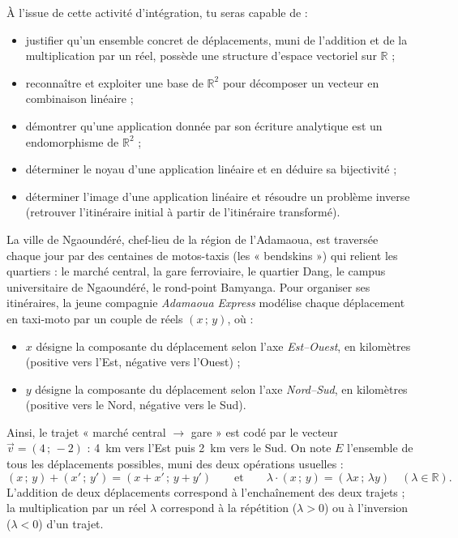 \documentclass[11pt]{article}
\newcommand{\cle}[1]{{\popxbold\color{popdark}#1}}
\newcounter{popsec}
\newcounter{popsub}
\newcommand{\courssub}[1]{%
  \stepcounter{popsub}%
  \par\vspace{9pt}\noindent{\popxbold\fontsize{11.5}{13}\selectfont\color{popink}{\color{poporange}\thepopsec.\thepopsub}\hspace{6pt}#1}\par\nopagebreak\vspace{4pt}
}
\begin{document}
À l'issue de cette activité d'intégration, tu seras capable de :
\begin{itemize}
\item justifier qu'un ensemble concret de déplacements, muni de l'addition et de la multiplication par un réel, possède une structure d'\cle{espace vectoriel sur} $\mathbb{R}$ ;
\item reconnaître et exploiter une \cle{base} de $\mathbb{R}^2$ pour décomposer un vecteur en \cle{combinaison linéaire} ;
\item démontrer qu'une application donnée par son écriture analytique est un \cle{endomorphisme} de $\mathbb{R}^2$ ;
\item déterminer le \cle{noyau} d'une application linéaire et en déduire sa \cle{bijectivité} ;
\item déterminer l'\cle{image} d'une application linéaire et résoudre un problème inverse (retrouver l'itinéraire initial à partir de l'itinéraire transformé).
\end{itemize}

\courssub{Situation}

La ville de Ngaoundéré, chef-lieu de la région de l'Adamaoua, est traversée chaque jour par des centaines de motos-taxis (les « bendskins ») qui relient les quartiers : le marché central, la gare ferroviaire, le quartier Dang, le campus universitaire de Ngaoundéré, le rond-point Bamyanga. Pour organiser ses itinéraires, la jeune compagnie \emph{Adamaoua Express} modélise chaque déplacement en taxi-moto par un couple de réels $(x\,;\,y)$, où :
\begin{itemize}
\item $x$ désigne la composante du déplacement selon l'axe \emph{Est--Ouest}, en kilomètres (positive vers l'Est, négative vers l'Ouest) ;
\item $y$ désigne la composante du déplacement selon l'axe \emph{Nord--Sud}, en kilomètres (positive vers le Nord, négative vers le Sud).
\end{itemize}
Ainsi, le trajet « marché central $\to$ gare » est codé par le vecteur $\vec{v}=(4\,;\,-2)$ : \SI{4}{km} vers l'Est puis \SI{2}{km} vers le Sud. On note $E$ l'ensemble de tous les déplacements possibles, muni des deux opérations usuelles :
\[
(x\,;\,y)+(x'\,;\,y')=(x+x'\,;\,y+y') \qquad \text{et} \qquad \lambda\cdot(x\,;\,y)=(\lambda x\,;\,\lambda y)\quad (\lambda\in\mathbb{R}).
\]
L'addition de deux déplacements correspond à l'enchaînement des deux trajets ; la multiplication par un réel $\lambda$ correspond à la répétition ($\lambda>0$) ou à l'inversion ($\lambda<0$) d'un trajet.
\end{document}
